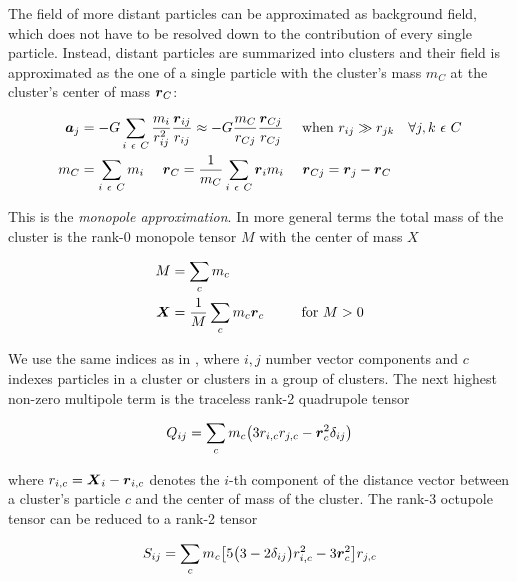 The field of more distant particles can be approximated as background field, which does not have to be resolved down to the contribution of every single particle. Instead, distant particles are summarized into clusters and their field is approximated as the one of a single particle with the cluster's mass $m_C$ at the cluster's center of mass $\boldsymbol{r}_C$:

\begin{align}
\label{ch02_grav02_eq001}
\boldsymbol{a}_j &= - G \sum_{i~\epsilon~C} \frac{m_i}{r_{ij}^2} \frac{\boldsymbol{r}_{ij}}{r_{ij}} \approx - G \frac{m_{C}}{r_{Cj}} \frac{\boldsymbol{r}_{Cj}}{r_{Cj}} ~~~~ \text{when}~r_{ij} \gg r_{jk} ~~~ \forall j,k ~ \epsilon~C \\
m_C &= \sum_{i~\epsilon~C} m_i ~~~~ \boldsymbol{r}_C = \frac{1}{m_C} \sum_{i~\epsilon~C} \boldsymbol{r}_i m_i ~~~~ \boldsymbol{r}_{Cj} = \boldsymbol{r}_j - \boldsymbol{r}_C 
\end{align}

This is the \emph{monopole approximation}. In more general terms the total mass of the cluster is the rank-0 monopole tensor $M$ with the center of mass $X$

\begin{align}
\label{ch02_grav02_eq002}
M & = \sum_{c} m_{c} \\
\boldsymbol{X}  & = \frac{1}{M} \sum_{c} m_{c} \boldsymbol{r}_{c} ~~~~~~~~ \text{for}~M > 0
\end{align}

We use the same indices as in \cite{McMillan:1993p43}, where $i,j$ number vector components and $c$ indexes particles in a cluster or clusters in a group of clusters. The next highest non-zero multipole term is the traceless rank-2 quadrupole tensor

\begin{equation}
\label{ch02_grav02_eq003}
Q_{ij} = \sum_{c} m_c \big( 3 r_{i, c} r_{j, c} - \boldsymbol{r}_{c}^2 \delta_{i j} \big) \\
\end{equation}

where $r_{i,c} = \boldsymbol{X}_i - \boldsymbol{r}_{i,c}$ denotes the $i$-th component of the distance vector between a cluster's particle $c$ and the center of mass of the cluster. The rank-3 octupole tensor can be reduced to a rank-2 tensor 

\begin{equation}
\label{ch02_grav02_eq004}
S_{ij}  = \sum_{c} m_c \big[ 5 \big( 3 - 2  \delta_{i j} \big) r_{i, c}^2 - 3 \boldsymbol{r}_{c}^2 \big] r_{j, c}\\
\end{equation}

